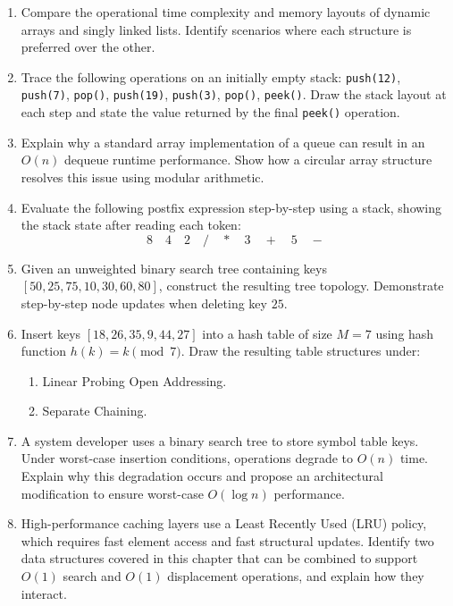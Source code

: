 \documentclass[12pt]{report}
\begin{document}
\begin{enumerate}
    \item Compare the operational time complexity and memory layouts of dynamic arrays and singly linked lists. Identify scenarios where each structure is preferred over the other.
    
    \item Trace the following operations on an initially empty stack: \texttt{push(12)}, \texttt{push(7)}, \texttt{pop()}, \texttt{push(19)}, \texttt{push(3)}, \texttt{pop()}, \texttt{peek()}. Draw the stack layout at each step and state the value returned by the final \texttt{peek()} operation.
    
    \item Explain why a standard array implementation of a queue can result in an $O(n)$ dequeue runtime performance. Show how a circular array structure resolves this issue using modular arithmetic.
    
    \item Evaluate the following postfix expression step-by-step using a stack, showing the stack state after reading each token:
    \[
    8 \quad 4 \quad 2 \quad / \quad * \quad 3 \quad + \quad 5 \quad -
    \]
    
    \item Given an unweighted binary search tree containing keys $[50, 25, 75, 10, 30, 60, 80]$, construct the resulting tree topology. Demonstrate step-by-step node updates when deleting key $25$.
    
    \item Insert keys $[18, 26, 35, 9, 44, 27]$ into a hash table of size $M = 7$ using hash function $h(k) = k \pmod 7$. Draw the resulting table structures under:
    \begin{enumerate}
        \item Linear Probing Open Addressing.
        \item Separate Chaining.
    \end{enumerate}
    
    \item A system developer uses a binary search tree to store symbol table keys. Under worst-case insertion conditions, operations degrade to $O(n)$ time. Explain why this degradation occurs and propose an architectural modification to ensure worst-case $O(\log n)$ performance.
    
    \item High-performance caching layers use a Least Recently Used (LRU) policy, which requires fast element access and fast structural updates. Identify two data structures covered in this chapter that can be combined to support $O(1)$ search and $O(1)$ displacement operations, and explain how they interact.
\end{enumerate}
\end{document}
